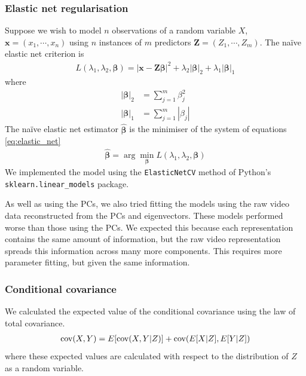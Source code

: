         \subsubsection{Elastic net regularisation}
        Suppose we wish to model $n$ observations of a random variable $X$, $\mathbf{x} = (x_1, \cdots, x_n)$ using $n$ instances of $m$ predictors $\mathbf{Z} = (Z_1, \cdots, Z_m)$. The na\"{i}ve elastic net criterion is
        \begin{align}\label{eq:elastic_net}
            L(\lambda_1, \lambda_2, \boldsymbol{\beta}) = | \mathbf{x} - \mathbf{Z} \boldsymbol{\beta} |^2 + \lambda_2 |\boldsymbol{\beta}|_2 + \lambda_1 |\boldsymbol{\beta}|_1
        \end{align}
        where
        \begin{align}
          |\boldsymbol{\beta}|_2 &= \sum_{j=1}^m \beta_j^2 \\
          |\boldsymbol{\beta}|_1 &= \sum_{j=1}^m |\beta_j|
        \end{align}
        The na\"{i}ve elastic net estimator $\hat{\boldsymbol{\beta}}$ is the minimiser of the system of equations \ref{eq:elastic_net}  \parencite{zou}
        \begin{align}
          \hat{\boldsymbol{\beta}} = \arg \min_{\boldsymbol{\beta}} L(\lambda_1, \lambda_2, \boldsymbol{\beta})
        \end{align}
        We implemented the model using the \texttt{ElasticNetCV} method of Python's \\ \texttt{sklearn.linear\_models} package.

        As well as using the PCs, we also tried fitting the models using the raw video data reconstructed from the PCs and eigenvectors. These models performed worse than those using the PCs. We expected this because each representation contains the same amount of information, but the raw video representation spreads this information across many more components. This requires more parameter fitting, but given the same information.

        \subsubsection{Conditional covariance}\label{sec:conditional_covariance}
        We calculated the expected value of the conditional covariance using the law of total covariance.
        \begin{align}\label{eq:law_of_total_covariance}
            \text{cov} (X,Y) = E[ \text{cov}(X,Y|Z)] + \text{cov}(E[X|Z], E[Y|Z])
        \end{align}
        where these expected values are calculated with respect to the distribution of $Z$ as a random variable.

